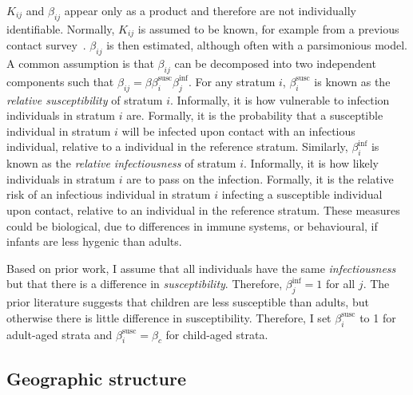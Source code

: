 \documentclass[thesis.tex]{subfiles}
\begin{document}
$K_{ij}$ and $\beta_{ij}$ appear only as a product and therefore are not individually identifiable.
Normally, $K_{ij}$ is assumed to be known, for example from a previous contact survey~\autocite[such as][]{mossongSocial}.
$\beta_{ij}$ is then estimated, although often with a parsimonious model.
A common assumption is that $\beta_{ij}$ can be decomposed into two independent components such that $\beta_{ij} = \beta \beta^\text{susc}_{i} \beta^\text{inf}_j$.
For any stratum $i$, $\beta^\text{susc}_i$ is known as the \emph{relative susceptibility} of stratum $i$.
Informally, it is how vulnerable to infection individuals in stratum $i$ are.
Formally, it is the probability that a susceptible individual in stratum $i$ will be infected upon contact with an infectious individual, relative to a individual in the reference stratum.
Similarly, $\beta^\text{inf}_i$ is known as the \emph{relative infectiousness} of stratum $i$.
Informally, it is how likely individuals in stratum $i$ are to pass on the infection.
Formally, it is the relative risk of an infectious individual in stratum $i$ infecting a susceptible individual upon contact, relative to an individual in the reference stratum.
These measures could be biological, \eg due to differences in immune systems, or behavioural, \eg if infants are less hygenic than adults.


Based on prior work, I assume that all individuals have the same \emph{infectiousness} but that there is a difference in \emph{susceptibility}.
Therefore, $\beta^\text{inf}_{j} = 1$ for all $j$.
The prior literature suggests that children are less susceptible than adults, but otherwise there is little difference in susceptibility.
Therefore, I set $\beta^\text{susc}_i$ to 1 for adult-aged strata and $\beta^\text{susc}_i = \beta_c$ for child-aged strata.

\subsection{Geographic structure} \label{SEIR:sec:geography}
\end{document}
